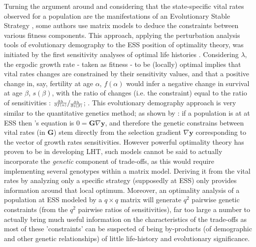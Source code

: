 \documentclass[10pt,a4paper]{article}
\newcommand{\lam}{$\lambda$}
\begin{document}
Turning the argument around and considering that the state-specific vital rates observed for a population are the manifestations of an Evolutionary Stable Strategy \citep[ESS; ][]{Parker1990}, some authors use matrix models to deduce the constraints between various fitness components.  This approach, applying the perturbation analysis tools of evolutionary demography to the ESS position of optimality %
theory, was initiated by the first sensitivity analyses of optimal life histories \citep{Caswell1982a,Caswell1982b,Caswell1987,Law1979,Schaffer1974}. 
Considering \lam, the ergodic growth rate - taken as fitness - to be (locally) optimal implies that vital rates changes are constrained by their sensitivity values, and that a positive change in, say,  fertility at age $\alpha$,  $f(\alpha)$ would infer a negative change in survival at age $\beta$, $s(\beta)$, with the ratio of changes (i.e. the constraint) equal to the ratio of sensitivities : $\sfrac{\frac{\partial \lambda}{\partial f(\alpha)}}{ \frac{\partial \lambda}{\partial s(\beta)}}$; \citep[see][for detailed analysis]{Caswell1984,Caswell1982,VanTienderen1995}. This evolutionary demography approach %
is very similar to the quantitative genetics method; as shown by \citet{Charlesworth1990a}: if a population is at at ESS then \citet{Lande1982}’s equation is $0=\mathbf{G} \nabla \bm{y}$, and therefore the genetic constrains between vital rates  (in $\mathbf{G}$) stem directly from the selection gradient $\nabla \bm{y}$ corresponding to the vector of growth rates sensitivities.%
 However powerful optimality theory has proven to be in developing LHT, such models cannot be said to actually incorporate the \emph{genetic} component of trade-offs, as this would require implementing several genotypes within a matrix model. Deriving it from the vital rates by analyzing only a specific strategy (supposedly at ESS) only provides information around that local optimum. Moreover, an optimality analysis of a population at ESS modeled by a $q \times q$ matrix will generate $q^2$ pairwise genetic constraints (from the $q^2$ pairwise ratios of sensitivities), far too large a number to actually bring much useful information on the characteristics of the trade-offs as most of these 'constraints' can be suspected of being by-products (of demographic and other genetic relationships) of little life-history and evolutionary significance. \\
\end{document}
